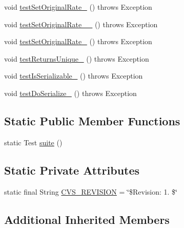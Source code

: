 \begin{DoxyCompactItemize}
\item 
void \hyperlink{classorg_1_1jgap_1_1impl_1_1_best_chromosomes_selector_test_a6e7a4b6302b1c1cb01c063917f9455bf}{test\-Set\-Original\-Rate\-\_} ()  throws Exception 
\item 
void \hyperlink{classorg_1_1jgap_1_1impl_1_1_best_chromosomes_selector_test_a21c2fa6ef36b224b61152daadc95b2d4}{test\-Set\-Original\-Rate\-\_\-\_} ()  throws Exception 
\item 
void \hyperlink{classorg_1_1jgap_1_1impl_1_1_best_chromosomes_selector_test_accef041deb5e095382c162b427d86fac}{test\-Set\-Original\-Rate\-\_} ()  throws Exception 
\item 
void \hyperlink{classorg_1_1jgap_1_1impl_1_1_best_chromosomes_selector_test_a571766234647a1162362435c1465a55b}{test\-Returns\-Unique\-\_} ()  throws Exception 
\item 
void \hyperlink{classorg_1_1jgap_1_1impl_1_1_best_chromosomes_selector_test_a684744a746ef3c99e8b1cfc203a4a71f}{test\-Is\-Serializable\-\_} ()  throws Exception 
\item 
void \hyperlink{classorg_1_1jgap_1_1impl_1_1_best_chromosomes_selector_test_a0cc6ac3252668f610936ef583c40dc6e}{test\-Do\-Serialize\-\_} ()  throws Exception 
\end{DoxyCompactItemize}
\subsection*{Static Public Member Functions}
\begin{DoxyCompactItemize}
\item 
static Test \hyperlink{classorg_1_1jgap_1_1impl_1_1_best_chromosomes_selector_test_a59d2430a7695a4b8165688fb400c095d}{suite} ()
\end{DoxyCompactItemize}
\subsection*{Static Private Attributes}
\begin{DoxyCompactItemize}
\item 
static final String \hyperlink{classorg_1_1jgap_1_1impl_1_1_best_chromosomes_selector_test_a8aed148320deaab264d956cf0791a9ec}{C\-V\-S\-\_\-\-R\-E\-V\-I\-S\-I\-O\-N} = \char`\"{}\$Revision\-: 1. \$\char`\"{}
\end{DoxyCompactItemize}
\subsection*{Additional Inherited Members}


